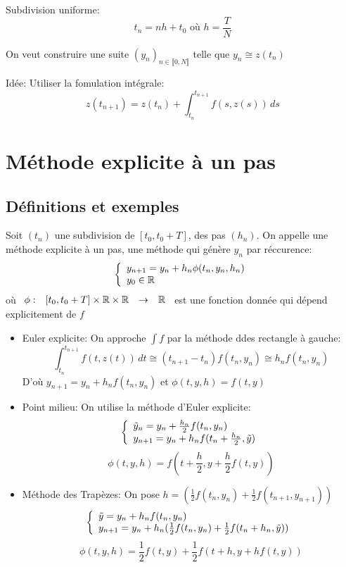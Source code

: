 \documentclass[]{report}
\begin{document}
    \begin{ex}{}{}
        Subdivision uniforme:
        \[t_n=nh+t_0\text{ où }h=\frac{T}{N}\]
    \end{ex}

    On veut construire une suite $(y_n)_{n\in \llbracket 0, N\rrbracket}$ telle que $y_n\cong z(t_n)$

    Idée: Utiliser la fomulation intégrale: 
    \[z(t_{n+1})=z(t_n)+\int_{t_n}^{t_{n+1}}f(s,z(s))\, ds\]

    \section{Méthode explicite à un pas}

    \subsection{Définitions et exemples}

    \begin{df}{}{}
        Soit $(t_n)$ une subdivision de $[t_0,t_0+T]$, des pas $(h_n)$. On appelle une méthode explicite à un pas, une méthode qui génère $y_n$ par réccurence:
        \[\left\{\begin{array}{ll} y_{n+1}=y_n+h_n\phi(t_n,y_n,h_n)\\ y_0\in \mathbb{R} \end{array} \right.\]
        où $\begin{array}{ccccc} \phi : & [t_0,t_0+T]\times \mathbb{R}\times \mathbb{R} & \to & \mathbb{R} \end{array}$ est une fonction donnée qui dépend explicitement de $f$
    \end{df}

    \begin{ex}{}{}
        \begin{itemize}
            \item Euler explicite: On approche $\int f$ par la méthode ddes rectangle à gauche:
            \[\int_{t_n}^{t_{n+1}}f(t,z(t))\, dt \cong (t_{n+1}-t_n)f(t_n,y_n)\cong h_n f(t_n,y_n)\]
            D'où $y_{n+1}=y_n+h_n f(t_n,y_n)$ et $\phi(t,y,h)=f(t,y)$
            \item Point milieu: On utilise la méthode d'Euler explicite:
            \[\left\{\begin{array}{ll} \tilde{y}_n=y_n+\frac{h_n}{2}f(t_n,y_n)\\ y_{n+1}=y_n+h_n f(t_n+\frac{h_n}{2},\tilde{y}) \end{array} \right.\]
            \[\phi(t,y,h)=f(t+\frac{h}{2},y+\frac{h}{2}f(t,y))\]
            \item Méthode des Trapèzes: On pose $h=(\frac{1}{2}f(t_n,y_n)+\frac{1}{2}f(t_{n+1},y_{n+1}))$
            \[\left\{\begin{array}{ll} \tilde{y}=y_n+h_n f(t_n,y_n)\\ y_{n+1}=y_n+h_n(\frac{1}{2}f(t_n,y_n)+\frac{1}{2}f(t_n+h_n,\tilde{y})) \end{array} \right.\]
            \[\phi(t,y,h)=\frac{1}{2}f(t,y)+\frac{1}{2}f(t+h,y+hf(t,y))\]
        \end{itemize}
    \end{ex}
\end{document}
